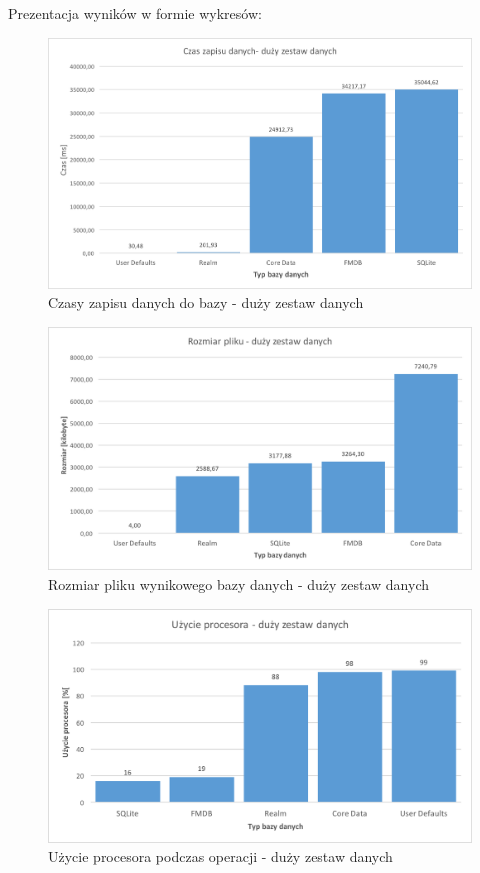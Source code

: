\newpage

Prezentacja wyników w formie wykresów: 

\begin{figure}[H]
\centering
	\includegraphics[width=13.5cm]{img/save_data/save_speed_big.png}
	\caption{Czasy zapisu danych do bazy - duży zestaw danych}
	\label{fig: big-save-time}
\end{figure}

\begin{figure}[H]
\centering
	\includegraphics[width=13.5cm]{img/save_data/save_file_big.png}
	\caption{Rozmiar pliku wynikowego bazy danych - duży zestaw danych}
	\label{fig: big-save-file-size}
\end{figure}

\begin{figure}[H]
\centering
	\includegraphics[width=15cm]{img/save_data/save_cpu_big.png}
	\caption{Użycie procesora podczas operacji - duży zestaw danych}
	\label{fig: big-save-cpu}
\end{figure}

